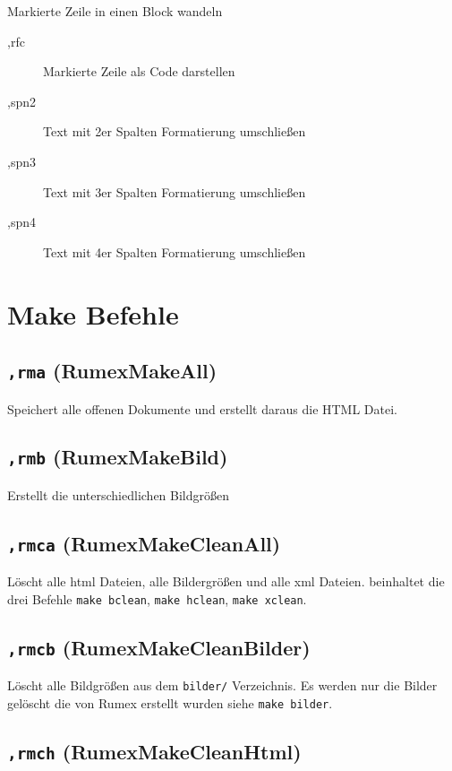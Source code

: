 Markierte Zeile in einen Block wandeln

\begin{description}
\item[,rfc]
Markierte Zeile als Code darstellen
\item[,spn2]
Text mit 2er Spalten Formatierung umschließen
\item[,spn3]
Text mit 3er Spalten Formatierung umschließen
\item[,spn4]
Text mit 4er Spalten Formatierung umschließen
\end{description}

\section{Make Befehle}\label{make-befehle}

\subsection{\texttt{,rma} (RumexMakeAll)}\label{rma-rumexmakeall}

Speichert alle offenen Dokumente und erstellt daraus die HTML Datei.

\subsection{\texttt{,rmb} (RumexMakeBild)}\label{rmb-rumexmakebild}

Erstellt die unterschiedlichen Bildgrößen

\subsection{\texttt{,rmca}
(RumexMakeCleanAll)}\label{rmca-rumexmakecleanall}

Löscht alle html Dateien, alle Bildergrößen und alle xml Dateien.
beinhaltet die drei Befehle \texttt{make bclean}, \texttt{make hclean},
\texttt{make xclean}.

\subsection{\texttt{,rmcb}
(RumexMakeCleanBilder)}\label{rmcb-rumexmakecleanbilder}

Löscht alle Bildgrößen aus dem \texttt{bilder/} Verzeichnis. Es werden
nur die Bilder gelöscht die von Rumex erstellt wurden siehe
\texttt{make bilder}.

\subsection{\texttt{,rmch}
(RumexMakeCleanHtml)}\label{rmch-rumexmakecleanhtml}

